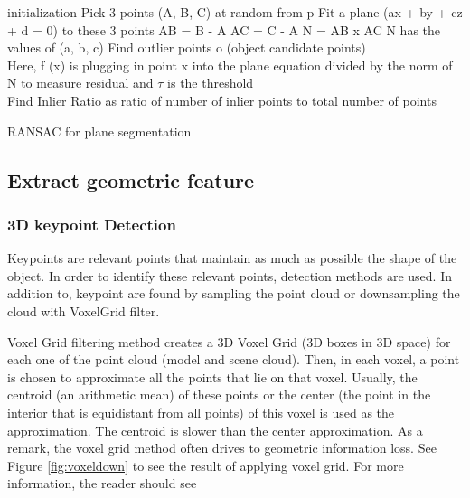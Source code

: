 \begin{algorithm}[H]
\SetAlgoLined
{}
 initialization\;
 {
 Pick 3 points (A, B, C) at random from p \;
 Fit a plane (ax + by + cz + d = 0) to these 3 points\;
    AB = B - A\;
    AC = C - A\;
    N = AB x AC\;
    N has the values of (a, b, c)\;
    Find outlier points o (object candidate points)\\
    Here, f (x) is plugging in point x into the plane equation divided by the norm of N to measure residual and $\tau$ is the threshold\\
    Find Inlier Ratio as ratio of number of inlier points to total number of points
}
\caption{RANSAC for plane segmentation \cite{cadPipeline3}}
\end{algorithm}



\subsection{Extract geometric feature}
\subsubsection{3D keypoint Detection}

Keypoints are relevant points that maintain as much as possible the shape of the object. In order to identify these relevant points, detection methods are used. In addition to, keypoint are found by sampling the point cloud or downsampling the cloud with  VoxelGrid filter.

Voxel Grid filtering method \cite{algFiltering} creates a 3D Voxel Grid
(3D boxes in 3D space) for each one of the point cloud (model and scene cloud). Then, in each voxel, a point is chosen to approximate all the points that lie on that voxel. Usually, the centroid (an arithmetic mean) of these points or the center (the point in the interior that is equidistant from all points) of this voxel is used as the approximation. The centroid is slower than the center approximation. As a remark, the voxel grid method often drives to geometric information loss. See Figure \ref{fig:voxeldown} to see the result of applying voxel grid. For more information, the reader should see \cite{algDownsampling}



